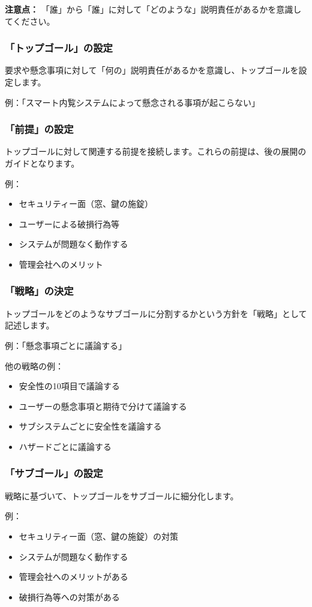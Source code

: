 \textbf{注意点：} 「誰」から「誰」に対して「どのような」説明責任があるかを意識してください。

\subsubsection{「トップゴール」の設定}
要求や懸念事項に対して「何の」説明責任があるかを意識し、トップゴールを設定します。

例：「スマート内覧システムによって懸念される事項が起こらない」

\subsubsection{「前提」の設定}
トップゴールに対して関連する前提を接続します。これらの前提は、後の展開のガイドとなります。

例：
\begin{itemize}
    \item セキュリティー面（窓、鍵の施錠）
    \item ユーザーによる破損行為等
    \item システムが問題なく動作する
    \item 管理会社へのメリット
\end{itemize}

\subsubsection{「戦略」の決定}
トップゴールをどのようなサブゴールに分割するかという方針を「戦略」として記述します。

例：「懸念事項ごとに議論する」

他の戦略の例：
\begin{itemize}
    \item 安全性の10項目で議論する
    \item ユーザーの懸念事項と期待で分けて議論する
    \item サブシステムごとに安全性を議論する
    \item ハザードごとに議論する
\end{itemize}

\subsubsection{「サブゴール」の設定}
戦略に基づいて、トップゴールをサブゴールに細分化します。

例：
\begin{itemize}
    \item セキュリティー面（窓、鍵の施錠）の対策
    \item システムが問題なく動作する
    \item 管理会社へのメリットがある
    \item 破損行為等への対策がある
\end{itemize}

